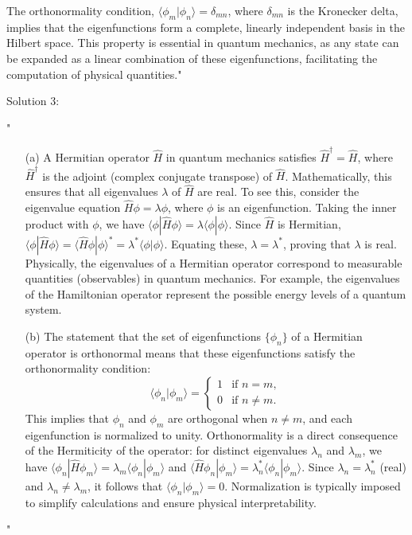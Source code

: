 The orthonormality condition, $\langle \phi_m | \phi_n \rangle = \delta_{mn}$, where $\delta_{mn}$ is the Kronecker delta, implies that the eigenfunctions form a complete, linearly independent basis in the Hilbert space. This property is essential in quantum mechanics, as any state can be expanded as a linear combination of these eigenfunctions, facilitating the computation of physical quantities."

Solution 3:

"\begin{enumerate}
    \item[(a)] A Hermitian operator $\hat{H}$ in quantum mechanics satisfies $\hat{H}^\dagger = \hat{H}$, where $\hat{H}^\dagger$ is the adjoint (complex conjugate transpose) of $\hat{H}$. Mathematically, this ensures that all eigenvalues $\lambda$ of $\hat{H}$ are real. To see this, consider the eigenvalue equation $\hat{H} \phi = \lambda \phi$, where $\phi$ is an eigenfunction. Taking the inner product with $\phi$, we have $\langle \phi | \hat{H} \phi \rangle = \lambda \langle \phi | \phi \rangle$. Since $\hat{H}$ is Hermitian, $\langle \phi | \hat{H} \phi \rangle = \langle \hat{H} \phi | \phi \rangle^* = \lambda^* \langle \phi | \phi \rangle$. Equating these, $\lambda = \lambda^*$, proving that $\lambda$ is real. Physically, the eigenvalues of a Hermitian operator correspond to measurable quantities (observables) in quantum mechanics. For example, the eigenvalues of the Hamiltonian operator represent the possible energy levels of a quantum system.

    \item[(b)] The statement that the set of eigenfunctions $\{\phi_n\}$ of a Hermitian operator is orthonormal means that these eigenfunctions satisfy the orthonormality condition:
    \[
    \langle \phi_n | \phi_m \rangle = 
    \begin{cases} 
    1 & \text{if } n = m, \\
    0 & \text{if } n \neq m.
    \end{cases}
    \]
    This implies that $\phi_n$ and $\phi_m$ are orthogonal when $n \neq m$, and each eigenfunction is normalized to unity. Orthonormality is a direct consequence of the Hermiticity of the operator: for distinct eigenvalues $\lambda_n$ and $\lambda_m$, we have $\langle \phi_n | \hat{H} \phi_m \rangle = \lambda_m \langle \phi_n | \phi_m \rangle$ and $\langle \hat{H} \phi_n | \phi_m \rangle = \lambda_n^* \langle \phi_n | \phi_m \rangle$. Since $\lambda_n = \lambda_n^*$ (real) and $\lambda_n \neq \lambda_m$, it follows that $\langle \phi_n | \phi_m \rangle = 0$. Normalization is typically imposed to simplify calculations and ensure physical interpretability.
\end{enumerate}"



